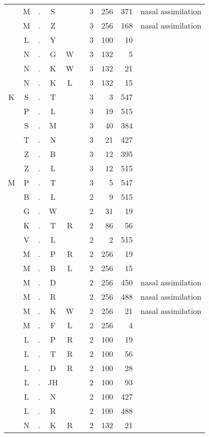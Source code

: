 \begin{center}
\begin{longtable}{c@{ } c@{ } c@{ } c@{ } c@{ } c@{ } r r r l }
  & M  & . & S  &   &   & 3 & 256 & 371 & nasal assimilation \\
  & M  & . & Z  &   &   & 3 & 256 & 168 & nasal assimilation \\
  & L  & . & Y  &   &   & 3 & 100 & 10 &  \\ 
  & N  & . & G  & W &   & 3 & 132 & 5 &  \\ 
  & N  & . & K  & W &   & 3 & 132 & 21 &  \\ 
  & N  & . & K  & L &   & 3 & 132 & 15 &  \\ 
K & S  & . & T  &   &   & 3 & 3 & 547 &  \\ 
  & P  & . & L  &   &   & 3 & 19 & 515 &  \\ 
  & S  & . & M  &   &   & 3 & 40 & 384 &  \\ 
  & T  & . & N  &   &   & 3 & 21 & 427 &  \\ 
  & Z  & . & B  &   &   & 3 & 12 & 395 &  \\ 
  & Z  & . & L  &   &   & 3 & 12 & 515 &  \\ 
M & P  & . & T  &   &   & 3 & 5 & 547 &  \\ 
  & B  & . & L  &   &   & 2 & 9 & 515 &  \\ 
  & G  & . & W  &   &   & 2 & 31 & 19 &  \\ 
  & K  & . & T  & R &   & 2 & 86 & 56 &  \\ 
  & V  & . & L  &   &   & 2 & 2 & 515 &  \\ 
  & M  & . & P  & R &   & 2 & 256 & 19 &  \\ 
  & M  & . & B  & L &   & 2 & 256 & 15 &  \\ 
  & M  & . & D  &   &   & 2 & 256 & 450 & nasal assimilation \\
  & M  & . & R  &   &   & 2 & 256 & 488 & nasal assimilation \\
  & M  & . & K  & W &   & 2 & 256 & 21 & nasal assimilation \\
  & M  & . & F  & L &   & 2 & 256 & 4 &  \\ 
  & L  & . & P  & R &   & 2 & 100 & 19 &  \\ 
  & L  & . & T  & R &   & 2 & 100 & 56 &  \\ 
  & L  & . & D  & R &   & 2 & 100 & 28 &  \\ 
  & L  & . & JH &   &   & 2 & 100 & 93 &  \\ 
  & L  & . & N  &   &   & 2 & 100 & 427 &  \\ 
  & L  & . & R  &   &   & 2 & 100 & 488 &  \\ 
  & N  & . & K  & R &   & 2 & 132 & 21 &  \\ 

\end{longtable}
\end{center}
